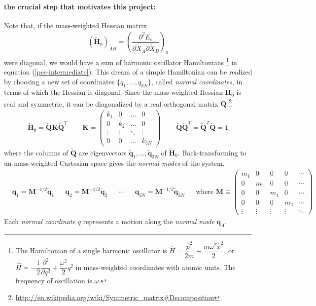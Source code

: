 \documentclass[11pt]{article}
\newcommand{\bo}[1]{\ensuremath{\mathbf{#1}}}
\newcommand{\tl}[1]{\ensuremath{\tilde{#1}}}
\newcommand{\pt}{\partial}
\renewcommand{\sp}{\ \ \ \ \ \ \ \ \ \ }
\newcommand{\fr}[2]{\dfrac{#1}{#2}}
\newcommand{\pr}[1]{\left(#1\right)}
\newcommand{\ma}[1]{\left(\begin{matrix}#1\end{matrix}\right)}
\newcommand{\pd}[3]{\ensuremath{ \dfrac{ \partial^{#1} #2 }{\partial #3 ^{#1}}}}
\newcommand{\ld}{\ensuremath{\ldots}}
\newcommand{\vd}{\ensuremath{\vdots}}
\newcommand{\dd}{\ensuremath{\ddots}}
\newcommand{\op}[1]{\ensuremath{\hat{#1}}}
\newcommand{\w}{\ensuremath{\omega}}
\begin{document}
\paragraph{the crucial step that motivates this project:} Note that, if the
mass-weighted Hessian matrix
\begin{align}
    (\tl{\bo{H}}_0)_{AB}
=
    \pr{\fr{\pt^2 E_e}{\pt\tl{X}_A\pt\tl{X}_B}}_0
\end{align}
were diagonal, we would have a sum of harmonic oscillator Hamiltonians
\footnote{The Hamiltonian of a single harmonic oscillator is
$\op{H}=\fr{\op{p}^2}{2m}+\fr{m\w^2\op{x}^2}{2}$, or
$\op{H}=-\fr{1}{2}\pd{2}{}{q}+\fr{\w^2}{2}q^2$ in mass-weighted coordinates
with atomic units.  The frequency of oscillation is $\w$.} in equation
(\ref{pes-intermediate}). This dream of a simple Hamiltonian can be realized by
choosing a new set of coordinates $\{q_1,\ld,q_{3N}\}$, called {\it normal coordinates}, in terms of which the Hessian is diagonal.
Since the mass-weighted Hessian $\tl{\bo{H}}_0$ is real and symmetric, it can
be diagonalized by a real orthogonal matrix $\bo{\tl{Q}}$
\footnote{\url{http://en.wikipedia.org/wiki/Symmetric_matrix\#Decomposition}}
\begin{align}
    \tl{\bo{H}}_0
=
    \bo{\tl{Q}}\bo{K}\bo{\tl{Q}}^T
\sp
    \bo{K}
=
    \ma{ k_1   &   0   &  \ld  &   0      \\
           0   & k_2   &  \ld  &   0      \\
          \vd  &  \vd  &  \dd  &  \vd     \\
           0   &   0   &  \ld  & k_{3N}   }
\sp
    \bo{\tl{Q}}\bo{\tl{Q}}^T=\bo{\tl{Q}}^T\bo{\tl{Q}}=\bo{1}
\end{align}
where the columns of $\bo{\tl{Q}}$ are eigenvectors $\bm{\tl{q}}_1,\ld,\bm{\tl{q}}_{3N}$ of
$\tl{\bo{H}}_0$.
Back-transforming to un-mass-weighted Cartesian space
gives the \textit{normal modes} of the system.
\begin{align}
&
  \bm{q}_1
=
  \bo{M}^{-1/2}
  \bm{\tl{q}}_1
&&
  \bm{q}_2
=
  \bo{M}^{-1/2}
  \bm{\tl{q}}_2
&&
  \cdots
&&
  \bm{q}_{3N}
=
  \bo{M}^{-1/2}
  \bm{\tl{q}}_{3N}
&&
  \text{where  }
    \bo{M}
\equiv
    \ma{ m_1 & 0   & 0   & 0   & \cdots\\
         0   & m_1 & 0   & 0   & \cdots\\
         0   & 0   & m_1 & 0   & \cdots\\
         0   & 0   & 0   & m_2 & \cdots\\
         \vd & \vd & \vd & \vd & \dd}   
\end{align}
Each \textit{normal coordinate} $q$ represents a motion along the \textit{normal mode} $\bm{q}_A$.
\end{document}
